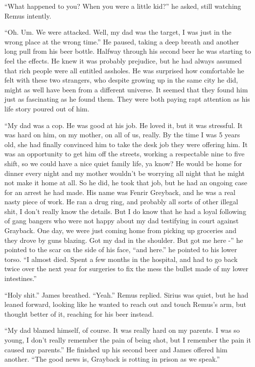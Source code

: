 \documentclass[12pt,twoside,openright]{memoir}
\begin{document}
``What happened to you? When you were a little kid?'' he asked, still watching Remus intently.

``Oh. Um. We were attacked. Well, my dad was the target, I was just in the wrong place at the wrong time.'' He paused, taking a deep breath and another long pull from his beer bottle. Halfway through his second beer he was starting to feel the effects. He knew it was probably prejudice, but he had always assumed that rich people were all entitled assholes. He was surprised how comfortable he felt with these two strangers, who despite growing up in the same city he did, might as well have been from a different universe. It seemed that they found him just as fascinating as he found them. They were both paying rapt attention as his life story poured out of him.

``My dad was a cop. He was good at his job. He loved it, but it was stressful. It was hard on him, on my mother, on all of us, really. By the time I was 5 years old, she had finally convinced him to take the desk job they were offering him. It was an opportunity to get him off the streets, working a respectable nine to five shift, so we could have a nice quiet family life, ya know? He would be home for dinner every night and my mother wouldn't be worrying all night that he might not make it home at all. So he did, he took that job, but he had an ongoing case for an arrest he had made. His name was Fenrir Greyback, and he was a real nasty piece of work. He ran a drug ring, and probably all sorts of other illegal shit, I don't really know the details. But I do know that he had a loyal following of gang bangers who were not happy about my dad testifying in court against Grayback. One day, we were just coming home from picking up groceries and they drove by guns blazing. Got my dad in the shoulder. But got me here -'' he pointed to the scar on the side of his face, ``and here.'' he pointed to his lower torso. ``I almost died. Spent a few months in the hospital, and had to go back twice over the next year for surgeries to fix the mess the bullet made of my lower intestines.''

``Holy shit.'' James breathed. ``Yeah.'' Remus replied. Sirius was quiet, but he had leaned forward, looking like he wanted to reach out and touch Remus's arm, but thought better of it, reaching for his beer instead.

``My dad blamed himself, of course. It was really hard on my parents. I was so young, I don't really remember the pain of being shot, but I remember the pain it caused my parents.'' He finished up his second beer and James offered him another. ``The good news is, Grayback is rotting in prison as we speak.''
\end{document}
